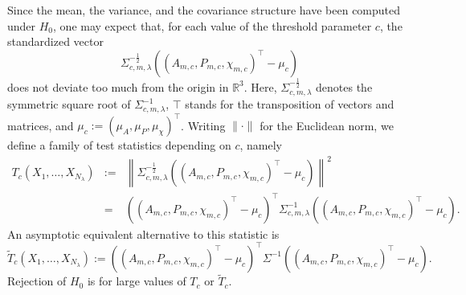 \documentclass[12pt]{article}
\def\R{\mathbb{R}}
\begin{document}
Since the mean, the variance, and the covariance structure have been computed under $H_0$, one may expect that, for each value of the threshold parameter $c$, the standardized vector
\begin{equation*}
\Sigma_{c,m,\lambda}^{-\frac{1}{2}}\left(\left(A_{m,c}, P_{m,c}, \chi_{m,c}\right)^\top-\mu_c\right)
\end{equation*}
does not deviate too much from the origin in $\R^3$. Here, $\Sigma_{c,m,\lambda}^{-\frac{1}{2}}$ denotes the symmetric square root of $\Sigma_{c,m,\lambda}^{-1}$, $\top$ stands
for the transposition of vectors and matrices, and $\mu_c:=(\mu_A,\mu_P,\mu_{\chi})^\top$. Writing $\|\cdot\|$ for the Euclidean norm, we define a family of test statistics depending on $c$, namely
\begin{eqnarray*}
T_c(X_1,\ldots,X_{N_\lambda})& := & \left\|\Sigma_{c,m,\lambda}^{-\frac{1}{2}}\left(\left(A_{m,c}, P_{m,c}, \chi_{m,c}\right)^\top-\mu_c\right)\right\|^2\\
& = & \left(\! \left(A_{m,c}, P_{m,c}, \chi_{m,c}\right)^\top\! -\! \mu_c\right)^\top \Sigma_{c,m,\lambda}^{-1}\left(\! \left(A_{m,c}, P_{m,c}, \chi_{m,c}\right)^\top\! -\! \mu_c\right).
\end{eqnarray*}
An asymptotic equivalent alternative to this statistic is
\begin{equation*}
\widetilde{T}_c(X_1,\ldots,X_{N_\lambda}):=\left(\left(A_{m,c}, P_{m,c}, \chi_{m,c}\right)^\top-\mu_c\right)^\top \Sigma^{-1}\left(\left(A_{m,c}, P_{m,c}, \chi_{m,c}\right)^\top-\mu_c\right).
\end{equation*}
Rejection of $H_0$ is for large values of $T_c$ or $\widetilde{T}_c$.
\end{document}
